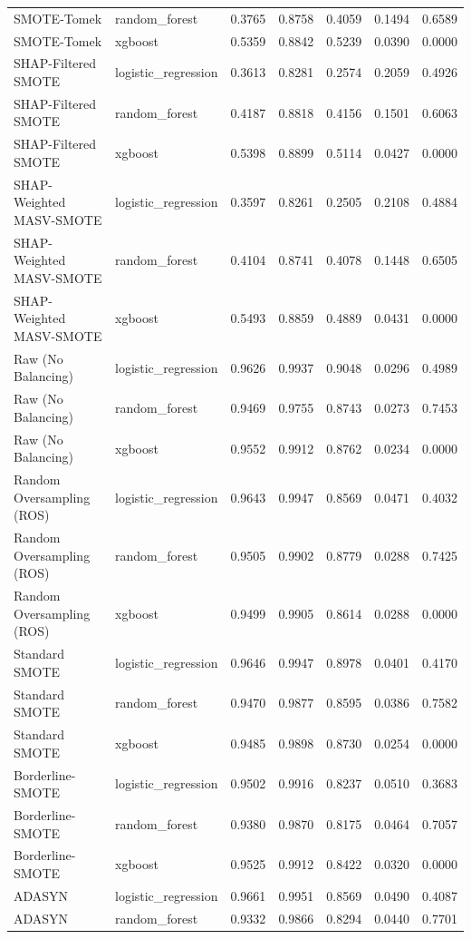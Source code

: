 \begin{table}[htbp]
\begin{tabular}{lllllll}
SMOTE-Tomek & random_forest & 0.3765 & 0.8758 & 0.4059 & 0.1494 & 0.6589 \\
SMOTE-Tomek & xgboost & 0.5359 & 0.8842 & 0.5239 & 0.0390 & 0.0000 \\
SHAP-Filtered SMOTE & logistic_regression & 0.3613 & 0.8281 & 0.2574 & 0.2059 & 0.4926 \\
SHAP-Filtered SMOTE & random_forest & 0.4187 & 0.8818 & 0.4156 & 0.1501 & 0.6063 \\
SHAP-Filtered SMOTE & xgboost & 0.5398 & 0.8899 & 0.5114 & 0.0427 & 0.0000 \\
SHAP-Weighted MASV-SMOTE & logistic_regression & 0.3597 & 0.8261 & 0.2505 & 0.2108 & 0.4884 \\
SHAP-Weighted MASV-SMOTE & random_forest & 0.4104 & 0.8741 & 0.4078 & 0.1448 & 0.6505 \\
SHAP-Weighted MASV-SMOTE & xgboost & 0.5493 & 0.8859 & 0.4889 & 0.0431 & 0.0000 \\
Raw (No Balancing) & logistic_regression & 0.9626 & 0.9937 & 0.9048 & 0.0296 & 0.4989 \\
Raw (No Balancing) & random_forest & 0.9469 & 0.9755 & 0.8743 & 0.0273 & 0.7453 \\
Raw (No Balancing) & xgboost & 0.9552 & 0.9912 & 0.8762 & 0.0234 & 0.0000 \\
Random Oversampling (ROS) & logistic_regression & 0.9643 & 0.9947 & 0.8569 & 0.0471 & 0.4032 \\
Random Oversampling (ROS) & random_forest & 0.9505 & 0.9902 & 0.8779 & 0.0288 & 0.7425 \\
Random Oversampling (ROS) & xgboost & 0.9499 & 0.9905 & 0.8614 & 0.0288 & 0.0000 \\
Standard SMOTE & logistic_regression & 0.9646 & 0.9947 & 0.8978 & 0.0401 & 0.4170 \\
Standard SMOTE & random_forest & 0.9470 & 0.9877 & 0.8595 & 0.0386 & 0.7582 \\
Standard SMOTE & xgboost & 0.9485 & 0.9898 & 0.8730 & 0.0254 & 0.0000 \\
Borderline-SMOTE & logistic_regression & 0.9502 & 0.9916 & 0.8237 & 0.0510 & 0.3683 \\
Borderline-SMOTE & random_forest & 0.9380 & 0.9870 & 0.8175 & 0.0464 & 0.7057 \\
Borderline-SMOTE & xgboost & 0.9525 & 0.9912 & 0.8422 & 0.0320 & 0.0000 \\
ADASYN & logistic_regression & 0.9661 & 0.9951 & 0.8569 & 0.0490 & 0.4087 \\
ADASYN & random_forest & 0.9332 & 0.9866 & 0.8294 & 0.0440 & 0.7701 \\

\end{tabular}
\end{table}
